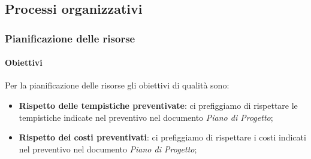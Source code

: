 	\subsection{Processi organizzativi}
		\subsubsection{Pianificazione delle risorse}
			\paragraph{Obiettivi}
			Per la pianificazione delle risorse gli obiettivi di qualità sono:
			\begin{itemize}
				\item \textbf{Rispetto delle tempistiche preventivate}: ci prefiggiamo di rispettare le tempistiche indicate nel preventivo nel documento \textit{Piano di Progetto};
				\item \textbf{Rispetto dei costi preventivati}: ci prefiggiamo di rispettare i costi indicati nel preventivo nel documento \textit{Piano di Progetto};
			\end{itemize}	
